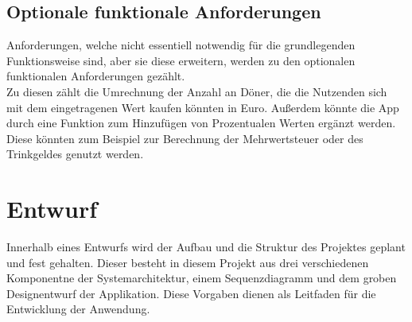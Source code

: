 \documentclass[conference]{IEEEtran}
\begin{document}
\subsection{Optionale funktionale Anforderungen}
Anforderungen, welche nicht essentiell notwendig für die grundlegenden Funktionsweise sind, aber sie diese erweitern, werden zu den optionalen funktionalen Anforderungen gezählt. \\
Zu diesen zählt die Umrechnung der Anzahl an Döner, die die Nutzenden sich mit dem eingetragenen Wert kaufen könnten in Euro. Außerdem könnte die App durch eine Funktion zum Hinzufügen von Prozentualen Werten ergänzt werden. Diese könnten zum Beispiel zur Berechnung der Mehrwertsteuer oder des Trinkgeldes genutzt werden.

\section{Entwurf}
Innerhalb eines Entwurfs wird der Aufbau und die Struktur des Projektes geplant und fest gehalten. Dieser besteht in diesem Projekt aus drei verschiedenen Komponentne der Systemarchitektur, einem Sequenzdiagramm und dem groben Designentwurf der Applikation. Diese Vorgaben dienen als Leitfaden für die Entwicklung der Anwendung.
\end{document}

